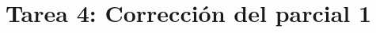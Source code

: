 \documentclass{doc}
\title{Tarea 4: Corrección del parcial 1}
\begin{document}
\makedocheader


\end{document}
